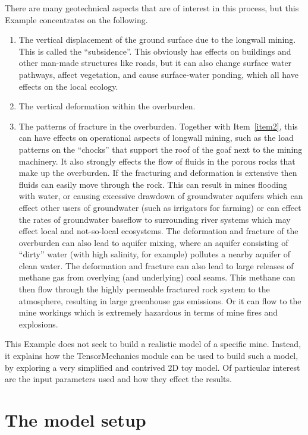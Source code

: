 \documentclass[]{scrreprt}
\begin{document}
There are many geotechnical aspects that are of interest in this
process, but this Example concentrates on the following.
\begin{enumerate}
\item The vertical displacement of the ground surface due to the
  longwall mining.  This is called the ``subsidence''.  This obviously
  has effects on buildings and other man-made structures like roads,
  but it can also change surface water pathways, affect vegetation,
  and cause surface-water ponding, which all have effects on the local
  ecology.
\item\label{item2} The vertical deformation within the overburden.
\item The patterns of fracture in the overburden.  Together with
  Item~\ref{item2}, this can have effects on operational aspects of
  longwall mining, such as the load patterns on the ``chocks'' that
  support the roof of the goaf next to the mining machinery.  It also
  strongly effects the flow of fluids in the porous rocks that make up
  the overburden.  If the fracturing and deformation is extensive then
  fluids can easily move through the rock.  This can result in mines
  flooding with water, or causing excessive drawdown of groundwater
  aquifers which can effect other users of groundwater (such as
  irrigators for farming) or can effect the rates of groundwater
  baseflow to surrounding river systems which may effect local and
  not-so-local ecosystems.  The deformation and fracture of the
  overburden can also lead to aquifer mixing, where an aquifer
  consisting of ``dirty'' water (with high salinity, for example)
  pollutes a nearby aquifer of clean water.  The deformation and
  fracture can also lead to large releases of methane gas from
  overlying (and underlying) coal seams.  This methane can then flow
  through the highly permeable fractured rock system to the
  atmosphere, resulting in large greenhouse gas emissions.  Or it can
  flow to the mine workings which is extremely hazardous in terms of
  mine fires and explosions.
\end{enumerate}

This Example does not seek to build a realistic model of a specific
mine.  Instead, it explains how the TensorMechanics module can be used
to build such a model, by exploring a very simplified and contrived 2D toy
model.  Of particular interest are the input parameters used and how they
effect the results.

\chapter{The model setup}
\label{m.d.chap}
\end{document}
